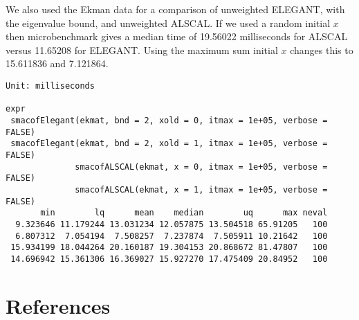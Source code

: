 \documentclass[
  12pt,
  letterpaper,
  DIV=11,
  numbers=noendperiod]{scrartcl}
\newcommand{\sectionbreak}{\clearpage}
\begin{document}
We also used the Ekman data for a comparison of unweighted ELEGANT, with
the eigenvalue bound, and unweighted ALSCAL. If we used a random initial
\(x\) then microbenchmark gives a median time of 19.56022 milliseconds
for ALSCAL versus 11.65208 for ELEGANT. Using the maximum sum initial
\(x\) changes this to 15.611836 and 7.121864.

\begin{verbatim}
Unit: milliseconds
                                                                    expr
 smacofElegant(ekmat, bnd = 2, xold = 0, itmax = 1e+05, verbose = FALSE)
 smacofElegant(ekmat, bnd = 2, xold = 1, itmax = 1e+05, verbose = FALSE)
              smacofALSCAL(ekmat, x = 0, itmax = 1e+05, verbose = FALSE)
              smacofALSCAL(ekmat, x = 1, itmax = 1e+05, verbose = FALSE)
       min        lq      mean    median        uq      max neval
  9.323646 11.179244 13.031234 12.057875 13.504518 65.91205   100
  6.807312  7.054194  7.508257  7.237874  7.505911 10.21642   100
 15.934199 18.044264 20.160187 19.304153 20.868672 81.47807   100
 14.696942 15.361306 16.369027 15.927270 17.475409 20.84952   100
\end{verbatim}

\sectionbreak

\section*{References}\label{references}
\end{document}
